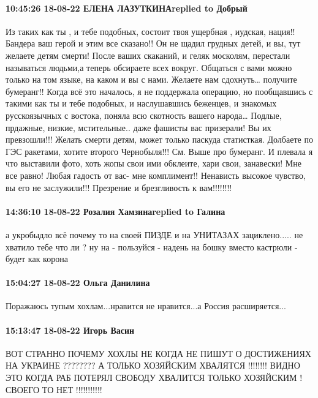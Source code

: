 \paragraph{10:45:26 18-08-22 ЕЛЕНА ЛАЗУТКИНАreplied to Добрый}

Из таких как ты , и тебе подобных, состоит твоя ущербная , иудская, нация!!
Бандера ваш герой и этим все сказано!! Он не щадил грудных детей, и вы, тут
желаете детям смерти! После ваших скаканий, и геляк москолям, перестали
называться людьми,а теперь обсираете всех вокруг. Общаться с вами можно только
на том языке, на каком и вы с нами. Желаете нам сдохнуть… получите бумеранг!!
Когда всё это началось, я не поддержала операцию, но пообщавшись с такими как
ты и тебе подобных, и наслушавшись беженцев, и знакомых русскоязычных с
востока, поняла всю скотность вашего народа… Подлые, прдажные, низкие,
мстительные.. даже фашисты вас призерали! Вы их превзошли!!! Желать смерти
детям, может только паскуда статисткая. Долбаете по ГЭС ракетами, хотите
второго Чернобыля!!! См. Выше про бумеранг. И плевала я что выставили фото,
хоть жопы свои ими обклеите, хари свои, занавески! Мне все равно! Любая гадость
от вас- мне комплимент!! Ненависть высокое чувство, вы его не заслужили!!!
Презрение и брезгливость к вам!!!!!!!!

\paragraph{14:36:10 18-08-22 Розалия Хамзинаreplied to Галина}

а укробыдло всё почему то на своей ПИЗДЕ и на УНИТАЗАХ зациклено..... не
хватило тебе что ли ? ну на - пользуйся - надень на бошку вместо кастрюли -
будет как корона

\paragraph{15:04:27 18-08-22 Ольга Данилина}

Поражаюсь тупым хохлам...нравится не нравится...а Россия расширяется...

\paragraph{15:13:47 18-08-22 Игорь Васин}

ВОТ СТРАННО ПОЧЕМУ ХОХЛЫ НЕ КОГДА НЕ ПИШУТ О ДОСТИЖЕНИЯХ НА УКРАИНЕ ???????? А
ТОЛЬКО ХОЗЯЙСКИМ ХВАЛЯТСЯ !!!!!!!! ВИДНО ЭТО КОГДА РАБ ПОТЕРЯЛ СВОБОДУ ХВАЛИТСЯ
ТОЛЬКО ХОЗЯЙСКИМ ! СВОЕГО ТО НЕТ !!!!!!!!!!!

